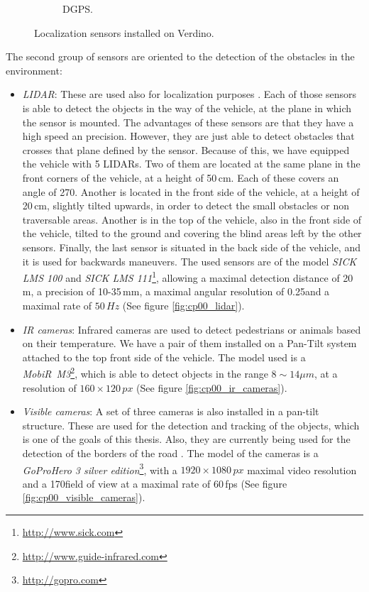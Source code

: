 \begin{figure}[h!]
\begin{subfigure}[b]{0.32\textwidth}
                \caption{\ac{DGPS}.}\label{fig:cp00_dgps}
        \end{subfigure}%
        \caption{Localization sensors installed on Verdino.}\label{fig:cp00_actuators}
\end{figure}

The second group of sensors are oriented to the detection of the obstacles in the environment:

\begin{itemize}
 \item \emph{\acf{LIDAR}}: These are used also for localization purposes \citep{Perea2013mcl}. Each of those sensors is able to detect the objects in the way of the vehicle, at the plane in which the sensor is mounted. The advantages of these sensors are that they have a high speed an precision. However, they are just able to detect obstacles that crosses that plane defined by the sensor. Because of this, we have equipped the vehicle with 5 \acp{LIDAR}. Two of them are located at the same plane in the front corners of the vehicle, at a height of 50\,cm. Each of these covers an angle of 270\textdegree. Another is located in the front side of the vehicle, at a height of 20\,cm, slightly tilted upwards, in order to detect the small obstacles or non traversable areas. Another is in the top of the vehicle, also in the front side of the vehicle, tilted to the ground and covering the blind areas left by the other sensors. Finally, the last sensor is situated in the back side of the vehicle, and it is used for backwards maneuvers. The used sensors are of the model \emph{SICK LMS 100} and \emph{SICK LMS 111}\footnote{\url{http://www.sick.com}}, allowing a maximal detection distance of 20\,m, a precision of 10-35\,mm, a maximal angular resolution of 0.25\textdegree and a maximal rate of $50\,Hz$ (See figure \ref{fig:cp00_lidar}).
 \item \emph{IR cameras}: Infrared cameras are used to detect pedestrians or animals based on their temperature. We have a pair of them installed on a Pan-Tilt system attached to the top front side of the vehicle. The model used is a \emph{MobiR\textregistered~M3}\footnote{\url{http://www.guide-infrared.com}}, which is able to detect objects in the range $8\sim14\mu m$, at a resolution of $160 \times 120\,px$ (See figure \ref{fig:cp00_ir_cameras}).
 \item \emph{Visible cameras}: A set of three cameras is also installed in a pan-tilt structure. These are used for the detection and tracking of the objects, which is one of the goals of this thesis. Also, they are currently being used for the detection of the borders of the road \citep{arnay2009applying}. The model of the cameras is a \emph{GoPro\textregistered Hero 3 silver edition}\footnote{\url{http://gopro.com}}, with a $1920 \times 1080 \, px$ maximal video resolution and a 170\textdegree field of view at a maximal rate of 60\,fps (See figure \ref{fig:cp00_visible_cameras}).
\end{itemize}

